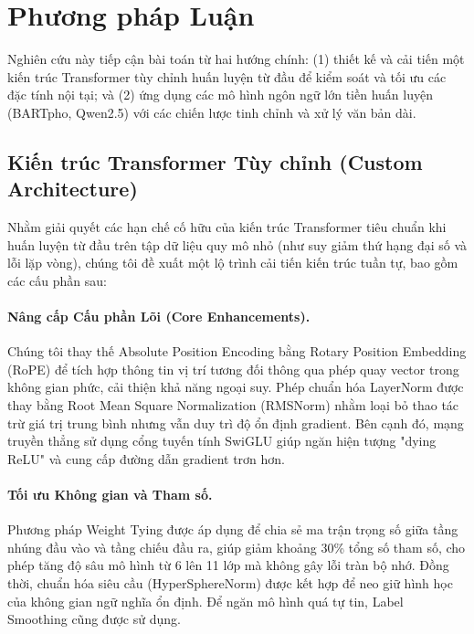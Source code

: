 \documentclass{article}
\begin{document}
\section{Phương pháp Luận}
\label{sec:methodology}

Nghiên cứu này tiếp cận bài toán từ hai hướng chính: (1) thiết kế và cải tiến một kiến trúc Transformer tùy chỉnh huấn luyện từ đầu để kiểm soát và tối ưu các đặc tính nội tại; và (2) ứng dụng các mô hình ngôn ngữ lớn tiền huấn luyện (BARTpho, Qwen2.5) với các chiến lược tinh chỉnh và xử lý văn bản dài. 

\subsection{Kiến trúc Transformer Tùy chỉnh (Custom Architecture)}

Nhằm giải quyết các hạn chế cố hữu của kiến trúc Transformer tiêu chuẩn khi huấn luyện từ đầu trên tập dữ liệu quy mô nhỏ (như suy giảm thứ hạng đại số và lỗi lặp vòng), chúng tôi đề xuất một lộ trình cải tiến kiến trúc tuần tự, bao gồm các cấu phần sau:

\paragraph{Nâng cấp Cấu phần Lõi (Core Enhancements).} 
Chúng tôi thay thế Absolute Position Encoding bằng Rotary Position Embedding (RoPE) \cite{rope} để tích hợp thông tin vị trí tương đối thông qua phép quay vector trong không gian phức, cải thiện khả năng ngoại suy. Phép chuẩn hóa LayerNorm được thay bằng Root Mean Square Normalization (RMSNorm) \cite{rmsnorm_custom} nhằm loại bỏ thao tác trừ giá trị trung bình nhưng vẫn duy trì độ ổn định gradient. Bên cạnh đó, mạng truyền thẳng sử dụng cổng tuyến tính SwiGLU \cite{swiglu_custom} giúp ngăn hiện tượng "dying ReLU" và cung cấp đường dẫn gradient trơn hơn.

\paragraph{Tối ưu Không gian và Tham số.} 
Phương pháp Weight Tying \cite{weight_tying_custom} được áp dụng để chia sẻ ma trận trọng số giữa tầng nhúng đầu vào và tầng chiếu đầu ra, giúp giảm khoảng 30\% tổng số tham số, cho phép tăng độ sâu mô hình từ 6 lên 11 lớp mà không gây lỗi tràn bộ nhớ. Đồng thời, chuẩn hóa siêu cầu (HyperSphereNorm) được kết hợp để neo giữ hình học của không gian ngữ nghĩa ổn định. Để ngăn mô hình quá tự tin, Label Smoothing \cite{label_smoothing_custom} cũng được sử dụng.
\end{document}
